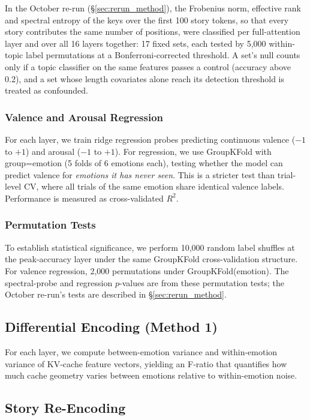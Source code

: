 In the October re-run (\S\ref{sec:rerun_method}), the Frobenius norm, effective rank and spectral entropy of the keys over the first 100 story tokens, so that every story contributes the same number of positions, were classified per full-attention layer and over all 16 layers together: 17 fixed sets, each tested by 5{,}000 within-topic label permutations at a Bonferroni-corrected threshold. A set's null counts only if a topic classifier on the same features passes a control (accuracy above 0.2), and a set whose length covariates alone reach its detection threshold is treated as confounded.

\subsubsection{Valence and Arousal Regression}

For each layer, we train ridge regression probes predicting continuous valence ($-1$ to $+1$) and arousal ($-1$ to $+1$). For regression, we use GroupKFold with group=emotion (5 folds of 6 emotions each), testing whether the model can predict valence for \emph{emotions it has never seen}. This is a stricter test than trial-level CV, where all trials of the same emotion share identical valence labels. Performance is measured as cross-validated $R^2$.

\subsubsection{Permutation Tests}

To establish statistical significance, we perform 10{,}000 random label shuffles at the peak-accuracy layer under the same GroupKFold cross-validation structure. For valence regression, 2{,}000 permutations under GroupKFold(emotion). The spectral-probe and regression $p$-values are from these permutation tests; the October re-run's tests are described in \S\ref{sec:rerun_method}.

\subsection{Differential Encoding (Method 1)}

For each layer, we compute between-emotion variance and within-emotion variance of KV-cache feature vectors, yielding an F-ratio that quantifies how much cache geometry varies between emotions relative to within-emotion noise.

\subsection{Story Re-Encoding}
\label{sec:reencoding}

